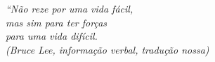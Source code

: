\begin{epigrafe}
    \vspace*{\fill}
	\begin{flushright}
		\textit{``Não reze por uma vida fácil, \\
		mas sim para ter forças \\
		para uma vida difícil.\\
		(Bruce Lee, informação verbal, tradução nossa)}
	\end{flushright}
\end{epigrafe}
